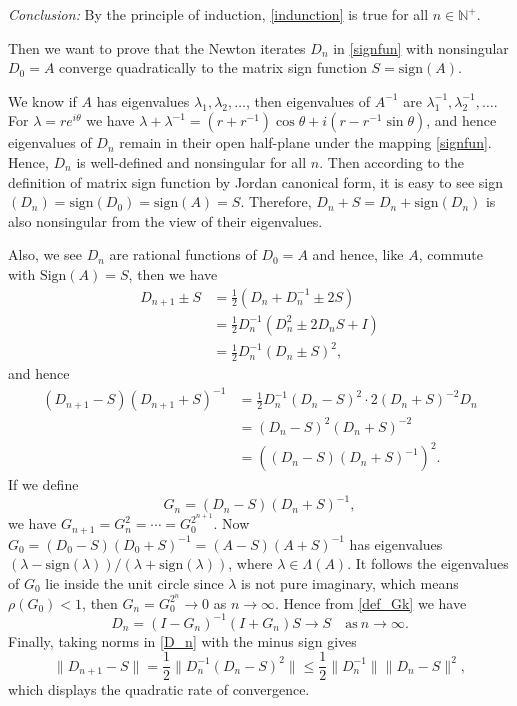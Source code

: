 \documentclass[12pt]{article}
\def\norm#1{\|#1\|}
\begin{document}
{\it Conclusion:} By the principle of induction, \eqref{indunction} is true for all $n\in \mathbb{N^+}$.

Then we want to prove that the Newton iterates $D_n$ in \eqref{signfun} with nonsingular $D_0=A$ converge quadratically to the matrix sign function $S=\text{sign}(A)$.

We know if $A$ has eigenvalues $\lambda_1,\lambda_2,\dotsc$, then eigenvalues of $A^{-1}$ are $\lambda_1^{-1},\lambda_2^{-1},\dotsc$. For $\lambda=re^{i\theta}$ we have $\lambda+\lambda^{-1}=(r+r^{-1})\cos\theta+i(r-r^{-1}\sin\theta)$, and hence eigenvalues of $D_n$ remain in their open half-plane under the mapping \eqref{signfun}. Hence, $D_n$ is well-defined and nonsingular for all $n$. Then according to the definition of matrix sign function by Jordan canonical form, it is easy to see sign$(D_n)=\text{sign}(D_0)=\text{sign}(A)=S$. Therefore, $D_n+S=D_n+\text{sign}(D_n)$ is also nonsingular from the view of their eigenvalues.

Also, we see $D_n$ are rational functions of $D_0=A$ and hence, like $A$, commute with $\text{Sign}(A)=S$, then we have 
\begin{align} \label{D_n}
D_{n+1}\pm S &= \frac{1}{2}(D_n+D_n^{-1}\pm 2S)  \nonumber \\
&= \frac{1}{2}D_n^{-1}(D_n^2\pm 2D_nS+ I) \nonumber\\
&= \frac{1}{2}D_n^{-1}(D_n\pm S)^2, 
\end{align}
and hence
\begin{align*}
(D_{n+1}- S)(D_{n+1}+ S)^{-1} &= \frac{1}{2}D_n^{-1}(D_n- S)^2 \cdot
2(D_n+S)^{-2}D_n \\
&= (D_n- S)^2(D_n+S)^{-2} \\
&= ((D_n- S)(D_n+S)^{-1})^2.
\end{align*}
If we define 
\begin{equation}\label{def_Gk}
G_n=(D_n- S)(D_n+S)^{-1},
\end{equation}
we have $G_{n+1}=G_{n}^2=\dotsm=G_{0}^{2^{n+1}}$. Now $G_0=(D_0-S)(D_0+S)^{-1}=(A-S)(A+S)^{-1}$ has eigenvalues $(\lambda-\text{sign}(\lambda))/(\lambda+\text{sign}(\lambda))$, where $\lambda\in \Lambda(A)$. It follows the eigenvalues of $G_0$ lie inside the unit circle since $\lambda$ is not pure imaginary, which means $\rho(G_0)<1$, then $G_n=G_{0}^{2^{n}}\to 0$ as $n\to \infty$. Hence from \eqref{def_Gk} we have
$$
D_n= (I-G_n)^{-1}(I+G_n)S \to S \quad \text{as} \ n\to\infty. 
$$
Finally, taking norms in \eqref{D_n} with the minus sign gives 
$$
\norm{D_{n+1}-S}=\frac{1}{2} \norm{D_n^{-1}(D_n - S)^2}\le
\frac{1}{2} \norm{D_n^{-1}}\norm{D_n - S}^2,
$$
which displays the quadratic rate of convergence.
\end{document}
